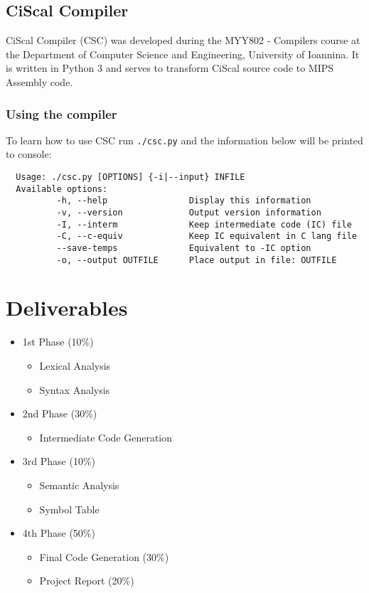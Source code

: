 \documentclass{article}
\begin{document}
\subsection{CiScal Compiler}
CiScal Compiler (CSC) was developed during the MYY802 - Compilers course at the Department of
Computer Science and Engineering, University of Ioannina. It is written in Python 3 and serves
to transform CiScal source code to MIPS Assembly code.

\subsubsection{Using the compiler}
To learn how to use CSC run \verb|./csc.py| and the information below will be printed to console:

\begin{verbatim}
  Usage: ./csc.py [OPTIONS] {-i|--input} INFILE
  Available options:
          -h, --help                Display this information
          -v, --version             Output version information
          -I, --interm              Keep intermediate code (IC) file
          -C, --c-equiv             Keep IC equivalent in C lang file
          --save-temps              Equivalent to -IC option
          -o, --output OUTFILE      Place output in file: OUTFILE
\end{verbatim}

\pagebreak



\section{Deliverables}

\begin{itemize}
 \item 1st Phase (10\%)
 \begin{itemize}
  \item Lexical Analysis
  \item Syntax Analysis
 \end{itemize}

 \item 2nd Phase (30\%)
 \begin{itemize}
  \item Intermediate Code Generation
 \end{itemize}
 
 \item 3rd Phase (10\%)
 \begin{itemize}
  \item Semantic Analysis
  \item Symbol Table
 \end{itemize}

 \item 4th Phase (50\%)
 \begin{itemize}
  \item Final Code Generation (30\%)
  \item Project Report (20\%)
 \end{itemize}
\end{itemize}
\end{document}
